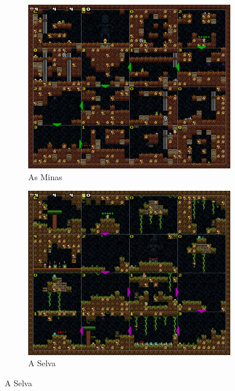 \begin{figure}[H]
\centering
	\begin{subfigure}[b]{0.36\textwidth}
		\includegraphics[width=\textwidth]{fig/spelunky-mines-example.pdf}
		\caption{As Minas}
		\label{fig:spelunky-mines-example}
	\end{subfigure}
	\begin{subfigure}[b]{0.36\textwidth}
		\includegraphics[width=\textwidth]{fig/spelunky-jungle-example.pdf}
		\caption{A Selva}
		\label{fig:spelunky-jungle-example}
	\end{subfigure}


\end{figure}
